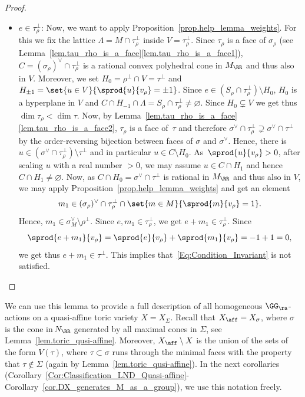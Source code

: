 \begin{proof}
\begin{enumerate}
\begin{itemize}
\item $e \in \tau_\rho^\bot$:
Now, we want to apply Proposition~\ref{prop.help_lemma_weights}.
For this we fix the lattice $\Lambda = M \cap \tau_{\rho}^\bot$ inside
$V = \tau_{\rho}^\bot$.
Since $\tau_\rho$ is a face of $\sigma_\rho$ (see Lemma~\ref{lem.tau_rho_is_a_face}\eqref{lem.tau_rho_is_a_face1}),
$C =(\sigma_\rho)^\vee \cap \tau_{\rho}^\bot$ is a rational convex polyhedral cone
in $M_\RR$ and thus also in $V$.
Moreover, we set $H_0 = \rho^\bot \cap V = \tau^\bot$
and $H_{\pm1} = \set{u \in V}{\sprod{u}{v_{\rho}} = \pm 1}$.
Since $e \in (S_\rho \cap \tau_\rho^\bot) \setminus H_0$, $H_0$ is a hyperplane in $V$ and
$C \cap H_{-1} \cap \Lambda = S_{\rho} \cap \tau_{\rho}^\bot \neq \varnothing$.
Since $H_0 \subsetneq V$ we get thus $\dim \tau_\rho < \dim \tau$.
Now, by Lemma~\ref{lem.tau_rho_is_a_face}\eqref{lem.tau_rho_is_a_face2},
$\tau_\rho$ is a face of~$\tau$ and therefore
$\sigma^\vee \cap \tau_\rho^\bot \supsetneq \sigma^\vee \cap \tau^\bot$
by the order-reversing bijection between faces of $\sigma$ and
$\sigma^\vee$. Hence,
there is $u \in (\sigma^\vee \cap \tau_\rho^\bot) \setminus \tau^\bot$ and in particular
$u \in C \setminus H_0$. As~$\sprod{u}{v_{\rho}} > 0$, after scaling $u$
with a real number $>0$, we may assume
$u \in C \cap H_1$ and hence $C \cap H_1 \neq \varnothing$.
Now, as $C \cap H_0 = \sigma^\vee \cap \tau^{\bot}$ is rational
in $M_{\RR}$ and thus also in $V$,
we may apply Proposition~\ref{prop.help_lemma_weights} and get an element
\[
m_1 \in (\sigma_\rho)^\vee \cap \tau_{\rho}^\bot \cap \set{m \in M}{\sprod{m}{v_{\rho}}=1}.
\]
Hence, $m_1 \in \sigma_M^\vee \setminus \rho^\bot$.
Since $e, m_1 \in \tau_{\rho}^\bot$, we get
$e + m_1 \in \tau_{\rho}^\bot$. Since
\[
\sprod{e + m_1}{v_{\rho}} = \sprod{e}{v_{\rho}} + \sprod{m_1}{v_{\rho}} = -1 + 1 = 0,
\]
we get thus $e + m_1 \in \tau^\bot$. This implies
that~\eqref{Eq:Condition_Invariant} is not satisfied.\qedhere
\end{itemize}
\end{enumerate}
\end{proof}

We can use this lemma to provide a full description of all homogeneous $\GG_\ra$-actions on a quasi-affine toric variety $X = X_\Sigma$.
Recall that $X_{\aff} = X_\sigma$, where $\sigma$ is the
cone in\,$N_{\RR}$ generated by all maximal cones in $\Sigma$, see
Lemma~\ref{lem.toric_qusi-affine}. Moreover, $X_{\aff} \setminus X$ is the union of the
sets of the form $V(\tau)$, where $\tau \subset \sigma$ runs through the minimal faces with
the property that $\tau \not\in \Sigma$ (again by Lemma~\ref{lem.toric_qusi-affine}).
In the next corollaries (Corollary~\ref{Cor:Classification_LND_Quasi-affine}- Corollary~\ref{cor.DX_generates_M_as_a_group}),
we use this notation freely.

